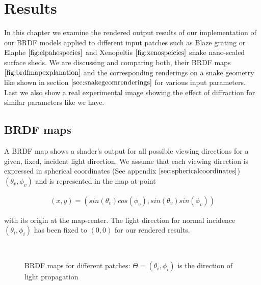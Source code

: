 \chapter{Results}
In this chapter we examine the rendered output results of our implementation of our BRDF models applied to different input patches such as Blaze grating or Elaphe $\ref{fig:elpahespecies}$ and Xenopeltis $\ref{fig:xenospeicies}$ snake nano-scaled surface sheds. We are discussing and comparing both, their BRDF maps $\ref{fig:brdfmapexplanation}$ and the corresponding renderings on a snake geometry like shown in section $\ref{sec:snakegeomrenderings}$ for various input parameters. Last we also show a real experimental image showing the effect of diffraction for similar parameters like we have.

\section{BRDF maps}
A BRDF map shows a shader's output for all possible viewing directions for a given, fixed, incident light direction. We assume that each viewing direction is expressed in spherical coordinates (See appendix $\ref{sec:sphericalcoordinates}$) $(\theta_v, \phi_v)$ and is represented in the map at point 

\begin{align}
(x,y) = (sin(\theta_v)cos(\phi_v), sin(\theta_v)sin(\phi_v))
\end{align}

with its origin at the map-center. The light direction for normal incidence $(\theta_i, \phi_i)$ has been fixed to $(0,0)$ for our rendered results.

\begin{figure}[H]
  \centering
~
~

\caption[BRDF Map]{BRDF maps for different patches: $\Theta=(\theta_i,\phi_i)$ is the direction of light propagation}
\label{fig:brdfmapexplanation}
\end{figure}


